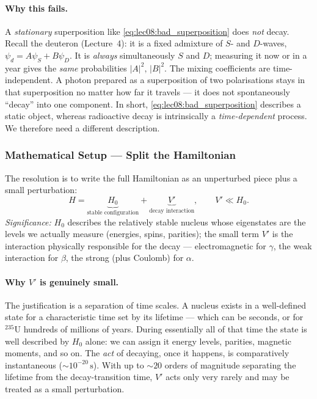 \paragraph{Why this fails.}
A \emph{stationary} superposition like \eqref{eq:lec08:bad_superposition} does
\emph{not} decay.  Recall the deuteron (Lecture~4): it is a fixed admixture of
$S$- and $D$-waves, $\psi_d = A\psi_S + B\psi_D$.  It is \emph{always}
simultaneously $S$ and $D$; measuring it now or in a year gives the \emph{same}
probabilities $|A|^2,\,|B|^2$.  The mixing coefficients are time-independent.  A
photon prepared as a superposition of two polarisations stays in that
superposition no matter how far it travels --- it does not spontaneously
``decay'' into one component.  In short, \eqref{eq:lec08:bad_superposition}
describes a static object, whereas radioactive decay is intrinsically a
\emph{time-dependent} process.  We therefore need a different description.

\subsubsection*{Mathematical Setup --- Split the Hamiltonian}
The resolution is to write the full Hamiltonian as an unperturbed piece plus a
small perturbation:
\begin{equation}
  \label{eq:lec08:H_split}
  \boxed{H = \underbrace{H_0}_{\text{stable configuration}}
            + \underbrace{V'}_{\text{decay interaction}}, \qquad V' \ll H_0.}
\end{equation}
\textit{Significance:} $H_0$ describes the relatively stable nucleus whose
eigenstates are the levels we actually measure (energies, spins, parities); the
small term $V'$ is the interaction physically responsible for the decay ---
electromagnetic for $\gamma$, the weak interaction for $\beta$, the strong (plus
Coulomb) for $\alpha$.

\paragraph{Why $V'$ is genuinely small.}
The justification is a separation of time scales.  A nucleus exists in a
well-defined state for a characteristic time set by its lifetime --- which can be
seconds, or for $^{235}$U hundreds of millions of years.  During essentially all
of that time the state is well described by $H_0$ alone: we can assign it
energy levels, parities, magnetic moments, and so on.  The \emph{act} of decaying,
once it happens, is comparatively instantaneous ($\sim 10^{-20}\,\text{s}$).  With
up to $\sim 20$ orders of magnitude separating the lifetime from the
decay-transition time, $V'$ acts only very rarely and may be treated as a small
perturbation.

